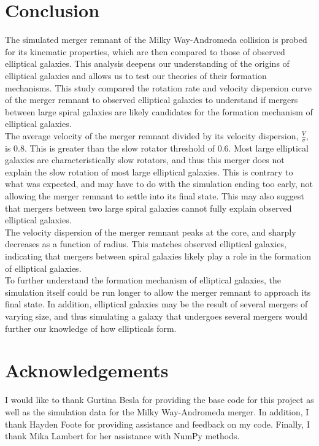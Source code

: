 \documentclass[twocolumn]{aastex63}
\begin{document}
\section{Conclusion}

The simulated merger remnant of the Milky Way-Andromeda collision is probed for its kinematic properties, which are then compared to those of observed elliptical galaxies. This analysis deepens our understanding of the origins of elliptical galaxies and allows us to test our theories of their formation mechanisms. This study compared the rotation rate and velocity dispersion curve of the merger remnant to observed elliptical galaxies to understand if mergers between large spiral galaxies are likely candidates for the formation mechanism of elliptical galaxies.\\

The average velocity of the merger remnant divided by its velocity dispersion, $\frac{V}{\sigma}$, is 0.8. This is greater than the slow rotator threshold of 0.6. Most large elliptical galaxies are characteristically slow rotators, and thus this merger does not explain the slow rotation of most large elliptical galaxies. This is contrary to what was expected, and may have to do with the simulation ending too early, not allowing the merger remnant to settle into its final state. This may also suggest that mergers between two large spiral galaxies cannot fully explain observed elliptical galaxies.\\

The velocity dispersion of the merger remnant peaks at the core, and sharply decreases as a function of radius. This matches observed elliptical galaxies, indicating that mergers between spiral galaxies likely play a role in the formation of elliptical galaxies.\\

To further understand the formation mechanism of elliptical galaxies, the simulation itself could be run longer to allow the merger remnant to approach its final state. In addition, elliptical galaxies may be the result of several mergers of varying size, and thus simulating a galaxy that undergoes several mergers would further our knowledge of how ellipticals form.

\section{Acknowledgements}

I would like to thank Gurtina Besla for providing the base code for this project as well as the simulation data for the Milky Way-Andromeda merger. In addition, I thank Hayden Foote for providing assistance and feedback on my code. Finally, I thank Mika Lambert for her assistance with NumPy methods.


{}

\end{document}
